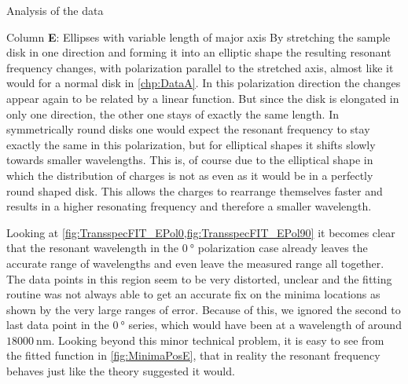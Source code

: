 \documentclass[pdftex, a4paper,11pt, twoside, UKenglish]{report}
\begin{document}
\begin{chapter}{Analysis of the data}
\begin{section}{Column \textbf{E}: Ellipses with variable length of
        major axis}
      By stretching the sample disk in one direction and forming it into an
      elliptic shape the resulting resonant frequency changes, with polarization
      parallel to the stretched axis, almost like it would for a normal disk
      in \cref{chp:DataA}. In this polarization direction the changes appear
      again to be related by a linear function. But since the disk is elongated
      in only one direction, the other one stays of exactly the same length.
      In symmetrically round disks one would expect the resonant frequency to
      stay exactly the same in this polarization, but for elliptical shapes it
      shifts slowly towards smaller wavelengths. This is, of course due to the
      elliptical shape in which the distribution of charges is not as even as it
      would be in a perfectly round shaped disk. This allows the charges to
      rearrange themselves faster and results in a higher resonating frequency
      and therefore a smaller wavelength.

      Looking at \cref{fig:TransspecFIT_EPol0,fig:TransspecFIT_EPol90} it
      becomes clear that the resonant wavelength in the $\SI{0}{\degree}$
      polarization case already leaves the accurate range of wavelengths and
      even leave the measured range all together.
      The data points in this region seem to be very distorted, unclear and
      the fitting routine was not always able to get an accurate fix on the
      minima locations as shown by the very large ranges of error. Because of
      this, we ignored the second to last data point in the $\SI{0}{\degree}$
      series, which would have been at a wavelength of around
      $\SI{18000}{\nano\meter}$. Looking beyond this minor technical problem,
      it is easy to see from the fitted function in \cref{fig:MinimaPosE},
      that in reality the resonant frequency behaves just like the theory
      suggested it would.
      

\end{section}
\end{chapter}
\end{document}
